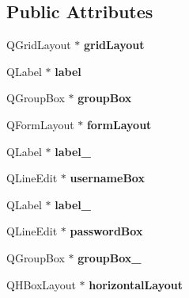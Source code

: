 \subsection*{Public Attributes}
\begin{DoxyCompactItemize}
\item 
Q\+Grid\+Layout $\ast$ {\bfseries grid\+Layout}\hypertarget{classUi__LoginGUI_a1f9cf5ee17095b63ae85a7bf77dd66f3}{}\label{classUi__LoginGUI_a1f9cf5ee17095b63ae85a7bf77dd66f3}

\item 
Q\+Label $\ast$ {\bfseries label}\hypertarget{classUi__LoginGUI_a953919b531db9fdc85f7ce34a6694aea}{}\label{classUi__LoginGUI_a953919b531db9fdc85f7ce34a6694aea}

\item 
Q\+Group\+Box $\ast$ {\bfseries group\+Box}\hypertarget{classUi__LoginGUI_a098fa1669ff011ea1ebbb007b046f4f9}{}\label{classUi__LoginGUI_a098fa1669ff011ea1ebbb007b046f4f9}

\item 
Q\+Form\+Layout $\ast$ {\bfseries form\+Layout}\hypertarget{classUi__LoginGUI_a801d5b0370beea5476872af7c2506ca4}{}\label{classUi__LoginGUI_a801d5b0370beea5476872af7c2506ca4}

\item 
Q\+Label $\ast$ {\bfseries label\+\_}\hypertarget{classUi__LoginGUI_a40ee4fd0d42771127fa6af9d46e1b1ff}{}\label{classUi__LoginGUI_a40ee4fd0d42771127fa6af9d46e1b1ff}

\item 
Q\+Line\+Edit $\ast$ {\bfseries username\+Box}\hypertarget{classUi__LoginGUI_a2b3b62049ee3282f01574f5a81eea0f2}{}\label{classUi__LoginGUI_a2b3b62049ee3282f01574f5a81eea0f2}

\item 
Q\+Label $\ast$ {\bfseries label\+\_}\hypertarget{classUi__LoginGUI_a0114fc093e176dec523e8280401bb8d7}{}\label{classUi__LoginGUI_a0114fc093e176dec523e8280401bb8d7}

\item 
Q\+Line\+Edit $\ast$ {\bfseries password\+Box}\hypertarget{classUi__LoginGUI_a365bbe3cc3907f78e77fdd67c751ebdf}{}\label{classUi__LoginGUI_a365bbe3cc3907f78e77fdd67c751ebdf}

\item 
Q\+Group\+Box $\ast$ {\bfseries group\+Box\+\_}\hypertarget{classUi__LoginGUI_a0cb760940f8ff614c6c472334cdf530a}{}\label{classUi__LoginGUI_a0cb760940f8ff614c6c472334cdf530a}

\item 
Q\+H\+Box\+Layout $\ast$ {\bfseries horizontal\+Layout}\hypertarget{classUi__LoginGUI_a99c2167578ed189389b1fd8265d5e224}{}\label{classUi__LoginGUI_a99c2167578ed189389b1fd8265d5e224}


\end{DoxyCompactItemize}
